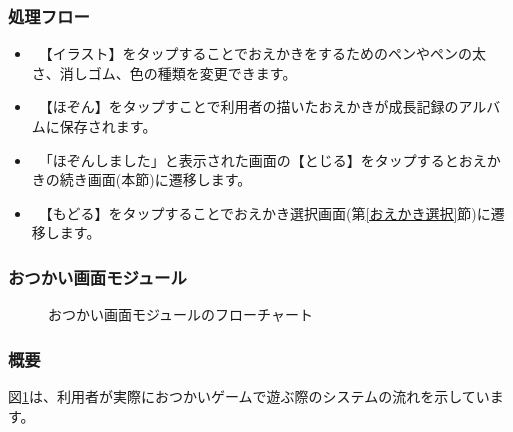 \documentclass[a4j]{jarticle}
\begin{document}
\subsubsection*{処理フロー}
\begin{itemize}
\item　【イラスト】をタップすることでおえかきをするためのペンやペンの太さ、消しゴム、色の種類を変更できます。
\item　【ほぞん】をタップすことで利用者の描いたおえかきが成長記録のアルバムに保存されます。
\item　「ほぞんしました」と表示された画面の【とじる】をタップするとおえかきの続き画面(本節)に遷移します。
\item　【もどる】をタップすることでおえかき選択画面(第\ref{おえかき選択}節)に遷移します。
\end{itemize}


\newpage

\subsubsection{おつかい画面モジュール\label{おつかい}}
\begin{figure}[H]
    \begin{center}
    \caption {おつかい画面モジュールのフローチャート}
    \label{otukai}
    \end{center}
\end{figure}

\subsubsection*{概要}
図\ref{otukai}は、利用者が実際におつかいゲームで遊ぶ際のシステムの流れを示しています。
\end{document}
